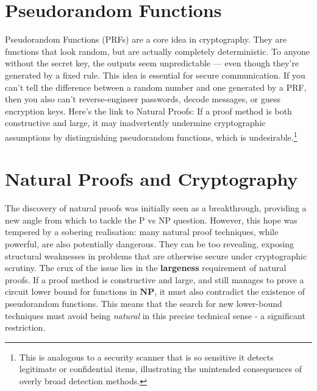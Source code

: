 \documentclass[12pt]{report}
\begin{document}
\section{Pseudorandom Functions}
Pseudorandom Functions (PRFs) are a core idea in cryptography.  
They are functions that look random, but are actually completely deterministic.  
To anyone without the secret key, the outputs seem unpredictable --- even though they're generated by a fixed rule.
This idea is essential for secure communication.  
If you can't tell the difference between a random number and one generated by a PRF, then you also can't reverse-engineer passwords, decode messages, or guess encryption keys.
Here's the link to Natural Proofs:  
If a proof method is both constructive and large, it may inadvertently undermine cryptographic assumptions by distinguishing pseudorandom functions, which is undesirable.\footnote{This is analogous to a security scanner that is so sensitive it detects legitimate or confidential items, illustrating the unintended consequences of overly broad detection methods.}

\section{Natural Proofs and Cryptography}
The discovery of natural proofs was initially seen as a breakthrough, providing a new angle from which to tackle the P vs NP question.
However, this hope was tempered by a sobering realisation: many natural proof techniques, while powerful, are also potentially dangerous.
They can be too revealing, exposing structural weaknesses in problems that are otherwise secure under cryptographic scrutiny.
The crux of the issue lies in the \textbf{largeness} requirement of natural proofs.
If a proof method is constructive and large, and still manages to prove a circuit lower bound for functions in $\mathbf{NP}$, it must also contradict the existence of pseudorandom functions.
This means that the search for new lower-bound techniques must avoid being \textit{natural} in this precise technical sense - a significant restriction.
\end{document}
